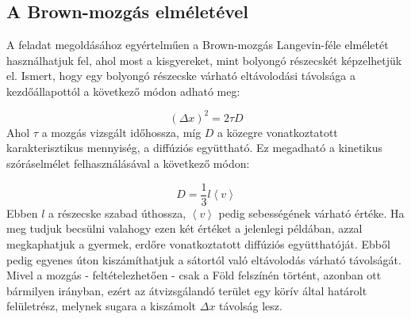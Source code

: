 \section{} \label{sec:1}

\subsection{A Brown-mozgás elméletével} \label{sub:3.1}
A feladat megoldásához egyértelműen a Brown-mozgás Langevin-féle elméletét használhatjuk fel, ahol most a kisgyereket, mint bolyongó részecskét képzelhetjük el. Ismert, hogy egy bolyongó részecske várható eltávolodási távolsága a kezdőállapottól a következő módon adható meg:

\begin{equation} \label{eq:1}
    \left( \Delta x \right)^{2}
    =
    2 \tau D
\end{equation}
Ahol $\tau$ a mozgás vizsgált időhossza, míg $D$ a közegre vonatkoztatott karakterisztikus mennyiség, a diffúziós együttható. Ez megadható a kinetikus szóráselmélet felhasználásával a következő módon:

\begin{equation} \label{eq:2}
    D
    =
    \frac{1}{3} l \left< v \right>
\end{equation}
Ebben $l$ a részecske szabad úthossza, $\left< v \right>$ pedig sebességének várható értéke. Ha meg tudjuk becsülni valahogy ezen két értéket a jelenlegi példában, azzal megkaphatjuk a gyermek, erdőre vonatkoztatott diffúziós együtthatóját. Ebből pedig egyenes úton kiszámíthatjuk a sátortól való eltávolodás várható távolságát. Mivel a mozgás - feltételezhetően - csak a Föld felszínén történt, azonban ott bármilyen irányban, ezért az átvizsgálandó terület egy körív által határolt felületrész, melynek sugara a kiszámolt $\Delta x$ távolság lesz.
\\ \\

